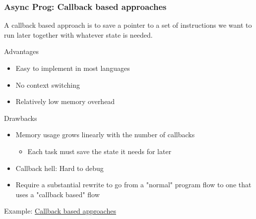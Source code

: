 \begin{frame}[fragile]
    \frametitle{Async Prog: Callback based approaches}
% 
% 
 A callback based approach is to save a pointer to a set of instructions we want to run later together with whatever state is needed.
 
{\color{red}Advantages}
 
     \begin{itemize}
         \item Easy to implement in most languages
         \item No context switching
         \item Relatively low memory overhead
     \end{itemize}
 
{\color{red}Drawbacks}
 
     \begin{itemize}
         \item Memory usage grows linearly with the number of callbacks
     	\begin{itemize}
     	    \item Each task must save the state it needs for later
     	\end{itemize}
         \item Callback hell: Hard to debug
         \item Require a substantial rewrite to go from a "normal" program flow to one that uses a "callback based" flow
     \end{itemize}
 
Example: \href{https://cfsamson.github.io/books-futures-explained/0_background_information.html#callback-based-approaches}{Callback based approaches}
 
\end{frame}



